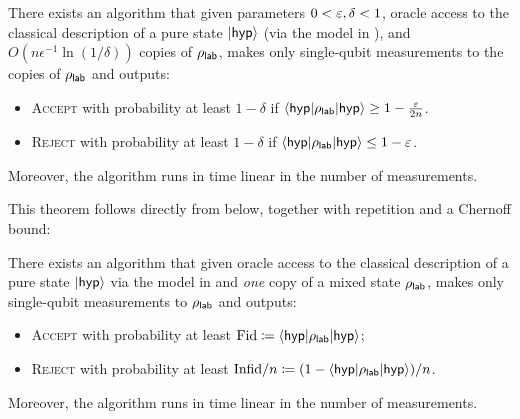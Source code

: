 \begin{maintheorem}\label{thm:main with repetitions}
    There exists an algorithm that given parameters $0 < \varepsilon, \delta < 1$, oracle access to the classical description of a pure state $\lvert\mathsf{hyp}\rangle$ (via the model in ), and $O(n\epsilon^{-1}\ln(1/\delta))$ copies of $\rho_{\mathsf{lab}}$, makes only single-qubit measurements to the copies of $\rho_{\mathsf{lab}}$ and outputs:
    \begin{itemize}
        \item \textsc{Accept} with probability at least $1-\delta$ if $\langle\mathsf{hyp}\rvert\rho_{\mathsf{lab}}\lvert\mathsf{hyp}\rangle \geq 1 - \frac{\varepsilon}{2n}$.
        \item \textsc{Reject} with probability at least $1-\delta$ if $\langle\mathsf{hyp}\rvert\rho_{\mathsf{lab}}\lvert\mathsf{hyp}\rangle\leq 1-\varepsilon$.
    \end{itemize}
    Moreover, the algorithm runs in time linear in the number of measurements.\vspace{1ex}
\end{maintheorem}

This theorem follows directly from  below, together with repetition and a Chernoff bound:
\begin{theorem}\label{thm:main}
    There exists an algorithm that given oracle access to the classical description of a pure state $\lvert\mathsf{hyp}\rangle$ via the model in  and \emph{one} copy of a mixed state $\rho_{\mathsf{lab}}$, makes only single-qubit measurements to $\rho_{\mathsf{lab}}$ and outputs: 
    \begin{itemize}
        \item \textsc{Accept} with probability at least $\text{Fid} \coloneqq \langle\mathsf{hyp}\rvert\rho_{\mathsf{lab}}\lvert\mathsf{hyp}\rangle$;
        \item \textsc{Reject} with probability at least $\text{Infid}/n \coloneqq (1-\langle\mathsf{hyp}\rvert\rho_{\mathsf{lab}}\lvert\mathsf{hyp}\rangle)/n$.
    \end{itemize}
    Moreover, the algorithm runs in time linear in the number of measurements.
\end{theorem}

